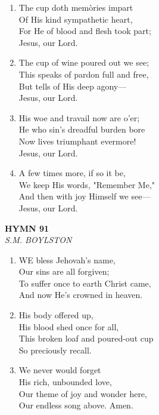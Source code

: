 \documentclass[11pt,a4paper]{article}
\begin{document}
\begin{enumerate}
    \item The cup doth mem\`ories impart \\
        Of His kind sympathetic heart, \\
        For He of blood and flesh took part; \\
        Jesus, our Lord.

    \item The cup of wine poured out we see; \\
        This speaks of pardon full and free, \\
        But tells of His deep agony--- \\
        Jesus, our Lord.

    \item His woe and travail now are o'er; \\
        He who sin's dreadful burden bore \\
        Now lives triumphant evermore! \\
        Jesus, our Lord.

    \item A few times more, if so it be, \\
        We keep His words, "Remember Me," \\
        And then with joy Himself we see--- \\
        Jesus, our Lord.

\end{enumerate}

\newpage
\begin{center}
    {\Large \textbf{HYMN 91\textdagger{}}}
    \\
    \textit{S.M. BOYLSTON}
\end{center}
\vspace{1em}

\begin{enumerate}
    \item WE bless Jehovah's name, \\
        Our sins are all forgiven; \\
        To suffer once to earth Christ came, \\
        And now He's crowned in heaven.

    \item His body offered up, \\
        His blood shed once for all, \\
        This broken loaf and poured-out cup \\
        So preciously recall.

    \item We never would forget \\
        His rich, unbounded love, \\
        Our theme of joy and wonder here, \\
        Our endless song above. Amen.

\end{enumerate}
\end{document}
